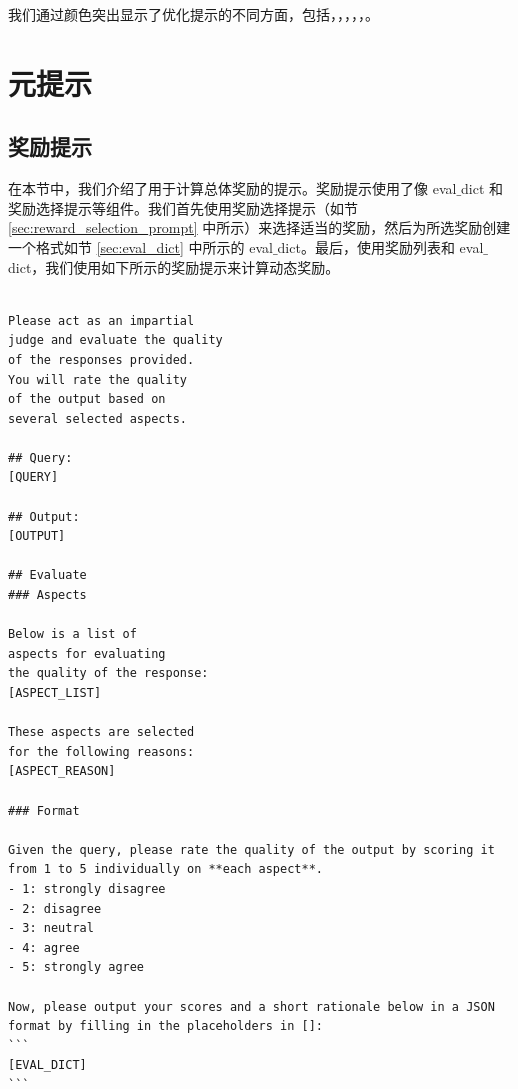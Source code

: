 我们通过颜色突出显示了优化提示的不同方面，包括，，，，，。

\newpage

\section{元提示}
\label{sec:meta_prompts}
\subsection{奖励提示}

在本节中，我们介绍了用于计算总体奖励的提示。奖励提示使用了像 eval$\_$dict 和奖励选择提示等组件。我们首先使用奖励选择提示（如节 \ref{sec:reward_selection_prompt} 中所示）来选择适当的奖励，然后为所选奖励创建一个格式如节 \ref{sec:eval_dict} 中所示的 eval$\_$dict。最后，使用奖励列表和 eval$\_$dict，我们使用如下所示的奖励提示来计算动态奖励。

\begin{lstlisting}[breaklines=true,breakatwhitespace=true]

Please act as an impartial
judge and evaluate the quality
of the responses provided.
You will rate the quality
of the output based on
several selected aspects.

## Query:
[QUERY]

## Output:
[OUTPUT]

## Evaluate
### Aspects

Below is a list of
aspects for evaluating
the quality of the response:
[ASPECT_LIST]

These aspects are selected
for the following reasons:
[ASPECT_REASON]

### Format

Given the query, please rate the quality of the output by scoring it from 1 to 5 individually on **each aspect**.
- 1: strongly disagree
- 2: disagree
- 3: neutral
- 4: agree
- 5: strongly agree

Now, please output your scores and a short rationale below in a JSON format by filling in the placeholders in []:
```
[EVAL_DICT]
```
\end{lstlisting}
